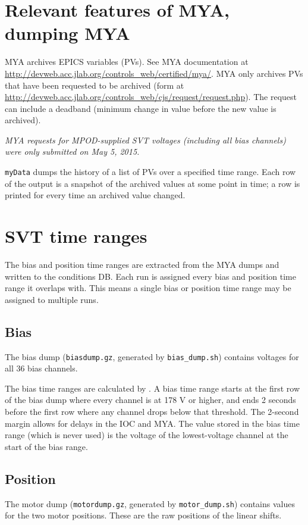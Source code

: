 \documentclass[aps,amsmath,amssymb,notitlepage,11pt,onecolumn]{revtex4-1}
\begin{document}
\section{Relevant features of MYA, dumping MYA}
MYA archives EPICS variables (PVs).
See MYA documentation at \url{http://devweb.acc.jlab.org/controls_web/certified/mya/}.
MYA only archives PVs that have been requested to be archived (form at \url{http://devweb.acc.jlab.org/controls_web/cjs/request/request.php}).
The request can include a deadband (minimum change in value before the new value is archived).

\emph{MYA requests for MPOD-supplied SVT voltages (including all bias channels) were only submitted on May 5, 2015.}

\texttt{myData} dumps the history of a list of PVs over a specified time range.
Each row of the output is a snapshot of the archived values at some point in time; a row is printed for every time an archived value changed.

\section{SVT time ranges}
The bias and position time ranges are extracted from the MYA dumps and written to the conditions DB.
Each run is assigned every bias and position time range it overlaps with.
This means a single bias or position time range may be assigned to multiple runs.

\subsection{Bias}
The bias dump (\texttt{biasdump.gz}, generated by \texttt{bias\_dump.sh}) contains voltages for all 36 bias channels.

The bias time ranges are calculated by .
A bias time range starts at the first row of the bias dump where every channel is at 178 V or higher, and ends 2 seconds before the first row where any channel drops below that threshold.
The 2-second margin allows for delays in the IOC and MYA.
The value stored in the bias time range (which is never used) is the voltage of the lowest-voltage channel at the start of the bias range.

\subsection{Position}
The motor dump (\texttt{motordump.gz}, generated by \texttt{motor\_dump.sh}) contains values for the two motor positions.
These are the raw positions of the linear shifts.
\end{document}
